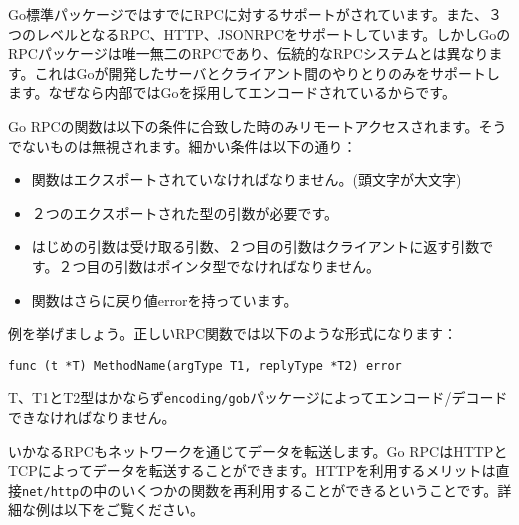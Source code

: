 Go標準パッケージではすでにRPCに対するサポートがされています。また、３つのレベルとなるRPC、HTTP、JSONRPCをサポートしています。しかしGoのRPCパッケージは唯一無二のRPCであり、伝統的なRPCシステムとは異なります。これはGoが開発したサーバとクライアント間のやりとりのみをサポートします。なぜなら内部ではGoを採用してエンコードされているからです。

Go RPCの関数は以下の条件に合致した時のみリモートアクセスされます。そうでないものは無視されます。細かい条件は以下の通り：

\begin{itemize}
  \item 関数はエクスポートされていなければなりません。(頭文字が大文字)
  \item ２つのエクスポートされた型の引数が必要です。
  \item はじめの引数は受け取る引数、２つ目の引数はクライアントに返す引数です。２つ目の引数はポインタ型でなければなりません。
  \item 関数はさらに戻り値errorを持っています。
\end{itemize}

例を挙げましょう。正しいRPC関数では以下のような形式になります：

\begin{lstlisting}[numbers=none]
func (t *T) MethodName(argType T1, replyType *T2) error
\end{lstlisting}

T、T1とT2型はかならず\texttt{encoding/gob}パッケージによってエンコード/デコードできなければなりません。

いかなるRPCもネットワークを通じてデータを転送します。Go RPCはHTTPとTCPによってデータを転送することができます。HTTPを利用するメリットは直接\texttt{net/http}の中のいくつかの関数を再利用することができるということです。詳細な例は以下をご覧ください。
